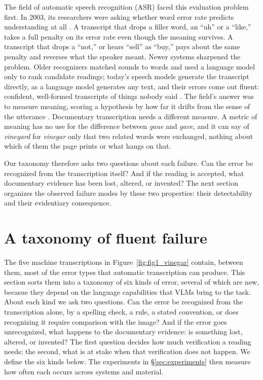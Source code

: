 \documentclass{anthology-ch}         %
\begin{document}
The field of automatic speech recognition (ASR) faced this evaluation problem first. In 2003, its researchers were asking whether word error rate predicts understanding at all \cite{wang_is_2003}. A transcript that drops a filler word, an ``uh'' or a ``like,'' takes a full penalty on its error rate even though the meaning survives. A transcript that drops a ``not,'' or hears ``sell'' as ``buy,'' pays about the same penalty and reverses what the speaker meant. Newer systems sharpened the problem. Older recognizers matched sounds to words and used a language model only to rank candidate readings; today's speech models generate the transcript directly, as a language model generates any text, and their errors come out fluent: confident, well-formed transcripts of things nobody said \cite{koudounas_hallucination_2025}. The field's answer was to measure meaning, scoring a hypothesis by how far it drifts from the sense of the utterance \cite{kim_semantic_2021}. Documentary transcription needs a different measure. A metric of meaning has no use for the difference between \emph{gaue} and \emph{gave}, and it can say of \emph{vineyard} for \emph{vinegar} only that two related words were exchanged, nothing about which of them the page prints or what hangs on that.

Our taxonomy therefore asks two questions about each failure. Can the error be recognized from the transcription itself? And if the reading is accepted, what documentary evidence has been lost, altered, or invented? The next section organizes the observed failure modes by these two properties: their detectability and their evidentiary consequence.

\section{A taxonomy of fluent failure}\label{sec:taxonomy}

The five machine transcriptions in Figure~\ref{fig:fig1_vinegar} contain, between them, most of the error types that automatic transcription can produce. This section sorts them into a taxonomy of six kinds of error, several of which are new, becasue they depend on the language capabilities that VLMs bring to the task. About each kind we ask two questions. Can the error be recognized from the transcription alone, by a spelling check, a rule, a stated convention, or does recognizing it require comparison with the image? And if the error goes unrecognized, what happens to the documentary evidence: is something lost, altered, or invented? The first question decides how much verification a reading needs; the second, what is at stake when that verification does not happen. We define the six
kinds below. The experiments in \S\ref{sec:experiments} then measure how often each occurs across systems and material.
\end{document}
